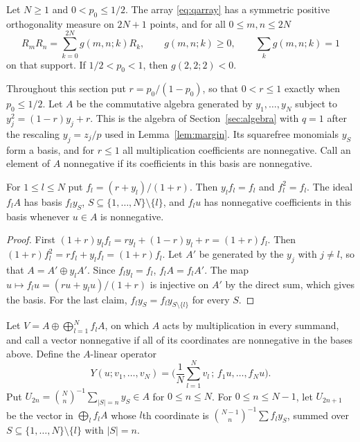 \begin{theorem}\label{thm:szwarc}
Let $N\geq1$ and $0<p_0\leq1/2$. The array \eqref{eq:qarray} has a symmetric positive orthogonality measure on $2N+1$ points, and for all $0\leq m,n\leq 2N$
\[
R_mR_n=\sum_{k=0}^{2N}g(m,n;k)R_k,\qquad g(m,n;k)\geq0,\qquad\sum_k g(m,n;k)=1
\]
on that support. If $1/2<p_0<1$, then $g(2,2;2)<0$.
\end{theorem}

Throughout this section put $r=p_0/(1-p_0)$, so that $0<r\leq1$ exactly when $p_0\leq1/2$. Let $A$ be the commutative algebra generated by $y_1,\ldots,y_N$ subject to $y_j^2=(1-r)y_j+r$. This is the algebra of Section~\ref{sec:algebra} with $q=1$ after the rescaling $y_j=z_j/p$ used in Lemma~\ref{lem:margin}. Its squarefree monomials $y_S$ form a basis, and for $r\leq1$ all multiplication coefficients are nonnegative. Call an element of $A$ nonnegative if its coefficients in this basis are nonnegative.

\begin{lemma}\label{lem:edge}
For $1\leq l\leq N$ put $f_l=(r+y_l)/(1+r)$. Then $y_lf_l=f_l$ and $f_l^2=f_l$. The ideal $f_lA$ has basis $f_ly_S$, $S\subseteq\{1,\ldots,N\}\setminus\{l\}$, and $f_l u$ has nonnegative coefficients in this basis whenever $u\in A$ is nonnegative.
\end{lemma}
\begin{proof}
First $(1+r)y_lf_l=ry_l+(1-r)y_l+r=(1+r)f_l$. Then $(1+r)f_l^2=rf_l+y_lf_l=(1+r)f_l$. Let $A'$ be generated by the $y_j$ with $j\neq l$, so that $A=A'\oplus y_lA'$. Since $f_ly_l=f_l$, $f_lA=f_lA'$. The map $u\mapsto f_lu=(ru+y_lu)/(1+r)$ is injective on $A'$ by the direct sum, which gives the basis. For the last claim, $f_ly_S=f_ly_{S\setminus\{l\}}$ for every $S$.
\end{proof}

Let $V=A\oplus\bigoplus_{l=1}^Nf_lA$, on which $A$ acts by multiplication in every summand, and call a vector nonnegative if all of its coordinates are nonnegative in the bases above. Define the $A$-linear operator
\[
Y(u;v_1,\ldots,v_N)=\Big(\frac1N\sum_{l=1}^Nv_l\,;\,f_1u,\ldots,f_Nu\Big).
\]
Put $U_{2n}=\binom Nn^{-1}\sum_{|S|=n}y_S\in A$ for $0\leq n\leq N$. For $0\leq n\leq N-1$, let $U_{2n+1}$ be the vector in $\bigoplus_lf_lA$ whose $l$th coordinate is $\binom{N-1}n^{-1}\sum f_ly_S$, summed over $S\subseteq\{1,\ldots,N\}\setminus\{l\}$ with $|S|=n$.

